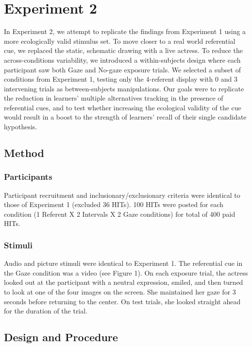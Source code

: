 \documentclass[authoryear, review]{elsarticle}
\begin{document}
\section{Experiment 2}\label{experiment-2}

In Experiment 2, we attempt to replicate the findings from Experiment 1
using a more ecologically valid stimulus set. To move closer to a real
world referential cue, we replaced the static, schematic drawing with a
live actress. To reduce the across-conditions variability, we introduced
a within-subjects design where each participant saw both Gaze and
No-gaze exposure trials. We selected a subset of conditions from
Experiment 1, testing only the 4-referent display with 0 and 3
intervening trials as between-subjects manipulations. Our goals were to
replicate the reduction in learners' multiple alternatives tracking in
the presence of referential cues, and to test whether increasing the
ecological validity of the cue would result in a boost to the strength
of learners' recall of their single candidate hypothesis.

\subsection{Method}\label{method-1}

\subsubsection{Participants}\label{participants-1}

Participant recruitment and inclusionary/exclusionary criteria were
identical to those of Experiment 1 (excluded 36 HITs). 100 HITs were
posted for each condition (1 Referent X 2 Intervals X 2 Gaze conditions)
for total of 400 paid HITs.

\subsubsection{Stimuli}\label{stimuli-1}

Audio and picture stimuli were identical to Experiment 1. The
referential cue in the Gaze condition was a video (see Figure 1). On
each exposure trial, the actress looked out at the participant with a
neutral expression, smiled, and then turned to look at one of the four
images on the screen. She maintained her gaze for 3 seconds before
returning to the center. On test trials, she looked straight ahead for
the duration of the trial.

\subsection{Design and Procedure}\label{design-and-procedure-1}
\end{document}
